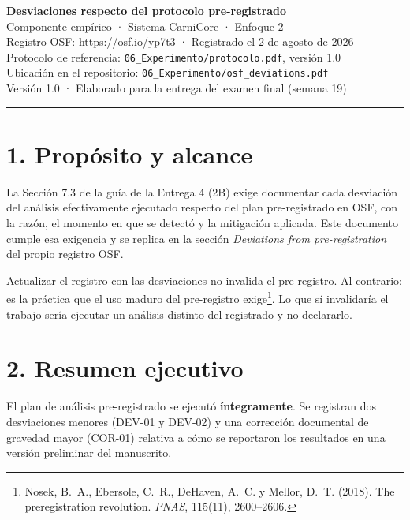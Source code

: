 \documentclass[11pt,a4paper]{article}
\begin{document}
\begin{center}
{\Large\bfseries\color{uteqverde}
Desviaciones respecto del protocolo pre-registrado}\\[4pt]
{\large Componente empírico · Sistema CarniCore · Enfoque 2}\\[8pt]
{\small Registro OSF: \url{https://osf.io/yp7t3} · Registrado el 2 de agosto de 2026}\\
{\small Protocolo de referencia: \texttt{06\_Experimento/protocolo.pdf}, versión 1.0}\\
{\small Ubicación en el repositorio: \texttt{06\_Experimento/osf\_deviations.pdf}}\\[4pt]
{\small Versión 1.0 · Elaborado para la entrega del examen final (semana 19)}
\end{center}

\vspace{6pt}
\hrule
\vspace{10pt}

\section*{1. Propósito y alcance}

La Sección 7.3 de la guía de la Entrega 4 (2B) exige documentar cada desviación
del análisis efectivamente ejecutado respecto del plan pre-registrado en OSF,
con la razón, el momento en que se detectó y la mitigación aplicada. Este
documento cumple esa exigencia y se replica en la sección \textit{Deviations
from pre-registration} del propio registro OSF.

Actualizar el registro con las desviaciones no invalida el pre-registro. Al
contrario: es la práctica que el uso maduro del pre-registro
exige\footnote{Nosek, B.~A., Ebersole, C.~R., DeHaven, A.~C. y Mellor, D.~T.
(2018). The preregistration revolution. \textit{PNAS}, 115(11), 2600--2606.}.
Lo que sí invalidaría el trabajo sería ejecutar un análisis distinto del
registrado y no declararlo.

\section*{2. Resumen ejecutivo}

El plan de análisis pre-registrado se ejecutó \textbf{íntegramente}. Se
registran dos desviaciones menores (DEV-01 y DEV-02) y una corrección
documental de gravedad mayor (COR-01) relativa a cómo se reportaron los
resultados en una versión preliminar del manuscrito.
\end{document}
